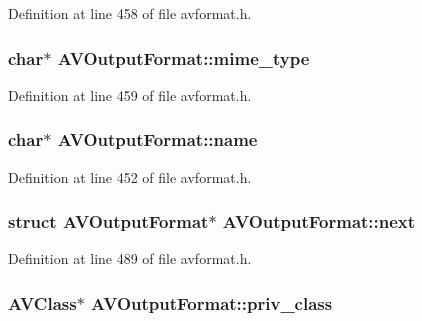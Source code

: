 Definition at line 458 of file avformat.\+h.

\subsubsection[{\texorpdfstring{mime\+\_\+type}{mime_type}}]{ char$\ast$ A\+V\+Output\+Format\+::mime\+\_\+type}\hypertarget{struct_a_v_output_format_ad94e0c8bd362cb9ffbfc44514481fc75}{}\label{struct_a_v_output_format_ad94e0c8bd362cb9ffbfc44514481fc75}


Definition at line 459 of file avformat.\+h.

\subsubsection[{\texorpdfstring{name}{name}}]{ char$\ast$ A\+V\+Output\+Format\+::name}\hypertarget{struct_a_v_output_format_ac3abc5f47f3465b6b7eec89c9476351c}{}\label{struct_a_v_output_format_ac3abc5f47f3465b6b7eec89c9476351c}


Definition at line 452 of file avformat.\+h.

\subsubsection[{\texorpdfstring{next}{next}}]{\setlength{\rightskip}{0pt plus 5cm}struct {\bf A\+V\+Output\+Format}$\ast$ A\+V\+Output\+Format\+::next}\hypertarget{struct_a_v_output_format_a381830276f0c71583a0ca014fcd2fc97}{}\label{struct_a_v_output_format_a381830276f0c71583a0ca014fcd2fc97}


Definition at line 489 of file avformat.\+h.

\subsubsection[{\texorpdfstring{priv\+\_\+class}{priv_class}}]{ {\bf A\+V\+Class}$\ast$ A\+V\+Output\+Format\+::priv\+\_\+class}\hypertarget{struct_a_v_output_format_ae030463c5c08de99f8c9e727c822ca87}{}\label{struct_a_v_output_format_ae030463c5c08de99f8c9e727c822ca87}


